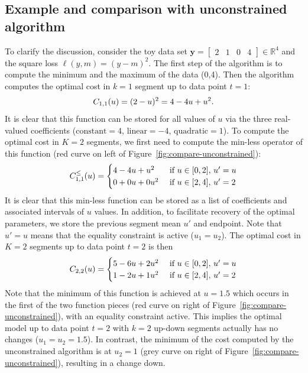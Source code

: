\documentclass{article}
\newcommand{\RR}{\mathbb R}
\begin{document}
\subsection{Example and comparison with unconstrained algorithm}

To clarify the discussion, consider the 
toy data set $\mathbf y= \left[
\begin{array}{cccccc}
  2 & 1 & 0 & 4
\end{array}
\right] \in\RR^4$ and the square loss $\ell(y,m)=(y-m)^2$. The first
step of the algorithm is to compute the minimum and the maximum of the
data (0,4). Then the algorithm computes the optimal cost in $k=1$
segment up to data point $t=1$:
\begin{equation}
  C_{1,1}(u) = (2-u)^2=4 - 4u + u^2.
\end{equation}
It is clear that this function can be stored for all values of $u$ via
the three real-valued coefficients ($\text{constant}=4$,
$\text{linear}=-4$, $\text{quadratic}=1$). To compute the optimal cost
in $K=2$ segments, we first need to compute the min-less operator of
this function (red curve on left of Figure~\ref{fig:compare-unconstrained}):
\begin{equation}
  C_{1,1}^\leq(u) =
  \begin{cases}
    4 - 4u + u^2 &\text{ if }u\in[0,2],\, u'=u\\
    0 + 0u + 0u^2 & \text{ if }u\in[2,4],\,  u'=2
  \end{cases}
\end{equation}
It is clear that this min-less function can be stored as a list of
coefficients and associated intervals of $u$ values.  
In addition, to
facilitate recovery of the optimal parameters, we store the previous
segment mean $u'$ and endpoint. Note that $u'=u$ means that the
equality constraint is active ($u_1=u_2$). The optimal cost in $K=2$
segments up to data point $t=2$ is then
\begin{equation}
  C_{2,2}(u) = 
  \begin{cases}
    5 - 6u + 2u^2 &\text{ if }u\in[0,2],\,  u'=u\\
    1 - 2u + 1u^2 &\text{ if }u\in[2,4],\,  u'=2
  \end{cases}
\end{equation}
Note that the minimum of this function is achieved at $u=1.5$ which
occurs in the first of the two function pieces (red curve on right of
Figure~\ref{fig:compare-unconstrained}), with an equality constraint
active. This implies the optimal model up to data point $t=2$ with
$k=2$ up-down segments actually has no changes ($u_1=u_2=1.5$). In contrast, the minimum of the cost computed by the unconstrained algorithm is at $u_2=1$ (grey curve on right of
Figure~\ref{fig:compare-unconstrained}), resulting in a change down.
\end{document}

